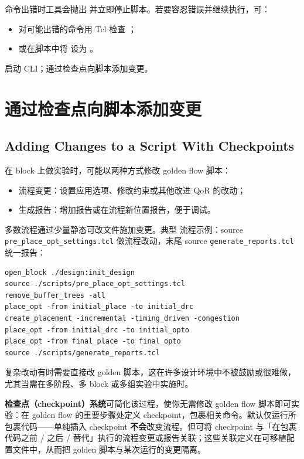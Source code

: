 命令出错时工具会抛出  并立即停止脚本。若要容忍错误并继续执行，可：
\begin{itemize}
  \item 对可能出错的命令用 Tcl  检查 ；
  \item 或在脚本中将  设为 。
\end{itemize}

\begin{seeAlsoBox}
启动 CLI；通过检查点向脚本添加变更。
\end{seeAlsoBox}

\section{通过检查点向脚本添加变更}
\subsection*{Adding Changes to a Script With Checkpoints}

在 block 上做实验时，可能以两种方式修改 golden flow 脚本：
\begin{itemize}
  \item 流程变更：设置应用选项、修改约束或其他改进 QoR 的改动；
  \item 生成报告：增加报告或在流程新位置报告，便于调试。
\end{itemize}

多数流程通过少量静态可改文件施加变更。典型  流程示例：source \texttt{pre\_place\_opt\_settings.tcl} 做流程改动，末尾 source \texttt{generate\_reports.tcl} 统一报告：
\begin{lstlisting}
open_block ./design:init_design
source ./scripts/pre_place_opt_settings.tcl
remove_buffer_trees -all
place_opt -from initial_place -to initial_drc
create_placement -incremental -timing_driven -congestion
place_opt -from initial_drc -to initial_opto
place_opt -from final_place -to final_opto
source ./scripts/generate_reports.tcl
\end{lstlisting}

复杂改动有时需要直接改 golden 脚本，这在许多设计环境中不被鼓励或很难做，尤其当需在多阶段、多 block 或多组实验中实施时。

\textbf{检查点（checkpoint）系统}可简化该过程，使你无需修改 golden flow 脚本即可实验：在 golden flow 的重要步骤处定义 checkpoint，包裹相关命令。默认仅运行所包裹代码——单纯插入 checkpoint \textbf{不会}改变流程。但可将 checkpoint 与「在包裹代码之前 / 之后 / 替代」执行的流程变更或报告关联；这些关联定义在可移植配置文件中，从而把 golden 脚本与某次运行的变更隔离。

